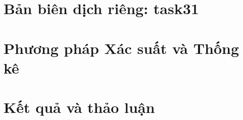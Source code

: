 \documentclass[13pt,a4paper,oneside]{extreport}
\begin{document}
\chapter*{Bản biên dịch riêng: task31}
\chapter{Phương pháp Xác suất và Thống kê}

\chapter{Kết quả và thảo luận}

\printbibliography
\end{document}
